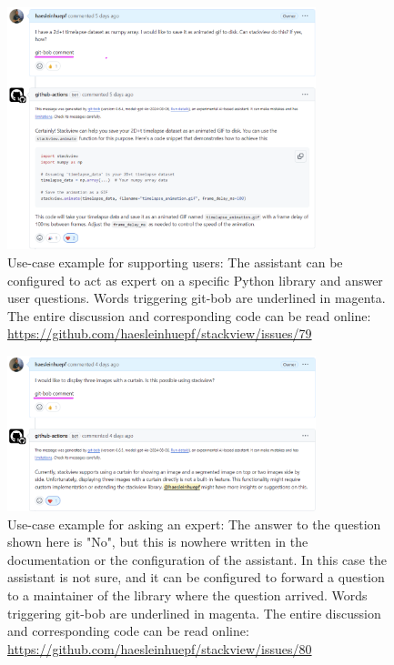 \documentclass[times, twoside]{zHenriquesLab-StyleBioRxiv}
\begin{document}
\begin{figure}[h]
\centering
\includegraphics[width=0.8\textwidth]{example_supporting_users.png}
\caption{Use-case example for supporting users: The assistant can be configured to act as expert on a specific Python library and answer user questions. Words triggering git-bob are underlined in magenta. The entire discussion and corresponding code can be read online: \url{https://github.com/haesleinhuepf/stackview/issues/79}
\newline
\newline
}
\label{fig:examplesupportingusers}
\end{figure}


\begin{figure}[h]
\centering
\includegraphics[width=0.8\textwidth]{example_supporting_users2.png}
\caption{Use-case example for asking an expert: The answer to the question shown here is "No", but this is nowhere written in the documentation or the configuration of the assistant. In this case the assistant is not sure, and it can be configured to forward a question to a maintainer of the library where the question arrived. Words triggering git-bob are underlined in magenta. The entire discussion and corresponding code can be read online: \url{https://github.com/haesleinhuepf/stackview/issues/80}
\newline
\newline
}
\label{fig:examplesupportingusers2}
\end{figure}
\end{document}
